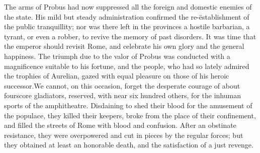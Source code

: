 

The arms of Probus had now suppressed all the foreign and
domestic enemies of the state. His mild but steady administration
confirmed the re-ëstablishment of the public tranquillity; nor
was there left in the provinces a hostile barbarian, a tyrant, or
even a robber, to revive the memory of past disorders. It was
time that the emperor should revisit Rome, and celebrate his own
glory and the general happiness. The triumph due to the valor of
Probus was conducted with a magnificence suitable to his fortune,
and the people, who had so lately admired the trophies of
Aurelian, gazed with equal pleasure on those of his heroic
successor.\footnotemark[55] We cannot, on this occasion, forget the desperate
courage of about fourscore gladiators, reserved, with near six
hundred others, for the inhuman sports of the amphitheatre.
Disdaining to shed their blood for the amusement of the populace,
they killed their keepers, broke from the place of their
confinement, and filled the streets of Rome with blood and
confusion. After an obstinate resistance, they were overpowered
and cut in pieces by the regular forces; but they obtained at
least an honorable death, and the satisfaction of a just revenge.\footnotemark[56]




